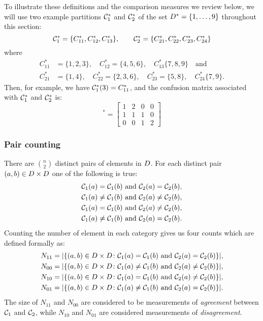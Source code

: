 To illustrate these definitions and the comparison measures we review below,
we will use two example partitions $\mathcal{C}^*_1$ and $\mathcal{C}^*_2$ of the set
$D^* = \{1,\dotsc,9\}$ throughout this section:
\begin{equation}
  \label{eq:example-parts}
  \mathcal{C}^*_1 = \{C^*_{11},C^*_{12},C^*_{13}\},\qquad
  \mathcal{C}^*_2 = \{C^*_{21},C^*_{22},C^*_{23},C^*_{24}\}
\end{equation}
where
\begin{align*}
  C^*_{11}&=\{1,2,3\},\quad C^*_{12}=\{4,5,6\},\quad C^*_{13}\{7,8,9\} \quad \text{and}\\
  C^*_{21}&=\{1,4\},\quad C^*_{22}=\{2,3,6\},\quad C^*_{23}=\{5,8\},\quad C^*_{24}\{7,9\}.
\end{align*}
Then, for example, we have $\mathcal{C}^*_1(3) = C^*_{11}$, and the confusion matrix
associated with $\mathcal{C}^*_1$ and $\mathcal{C}^*_2$ is:
\begin{equation*}
  [n_{ij}]^*=\left[
  \begin{matrix}
    1 & 2 & 0 & 0 \\
    1 & 1 & 1 & 0 \\
    0 & 0 & 1 & 2
  \end{matrix}
  \right]
\end{equation*}

\subsubsection{Pair counting}
\label{sec:pair-counting}

There are $\binom{n}{2}$ distinct pairs of elements in $D$.  For each
distinct pair $(a,b) \in D \times D$ one of the following is true:
\begin{align*}
\mathcal{C}_1(a)=\mathcal{C}_1(b) &\text{ and } \mathcal{C}_2(a)=\mathcal{C}_2(b),\\
\mathcal{C}_1(a)\neq \mathcal{C}_1(b) &\text{ and } \mathcal{C}_2(a)\neq \mathcal{C}_2(b),\\
\mathcal{C}_1(a)=\mathcal{C}_1(b) &\text{ and } \mathcal{C}_2(a)\neq \mathcal{C}_2(b),\\
\mathcal{C}_1(a)\neq \mathcal{C}_1(b) &\text{ and } \mathcal{C}_2(a)=\mathcal{C}_2(b).
\end{align*}
Counting the number of element in each category gives us four counts which are
defined formally as:
\begin{align*}
  N_{11} &= |\{(a,b) \in D \times D \colon
              \mathcal{C}_1(a)=\mathcal{C}_1(b) \text{ and } \mathcal{C}_2(a)=\mathcal{C}_2(b)
            \}|, \\
  N_{00} &= |\{(a,b) \in D \times D \colon
              \mathcal{C}_1(a)\neq\mathcal{C}_1(b) \text{ and } \mathcal{C}_2(a)\neq\mathcal{C}_2(b)
            \}|, \\
  N_{10} &= |\{(a,b) \in D \times D \colon
              \mathcal{C}_1(a)=\mathcal{C}_1(b) \text{ and } \mathcal{C}_2(a)\neq\mathcal{C}_2(b)
            \}|, \\
  N_{01} &= |\{(a,b) \in D \times D \colon
              \mathcal{C}_1(a)\neq\mathcal{C}_1(b) \text{ and } \mathcal{C}_2(a)=\mathcal{C}_2(b)
            \}|.
\end{align*}
The size of $N_{11}$ and $N_{00}$ are considered to be measurements of
\textit{agreement} between $\mathcal{C}_1$ and $\mathcal{C}_2$, while $N_{10}$ and
$N_{01}$ are considered measurements of \textit{disagreement}.

